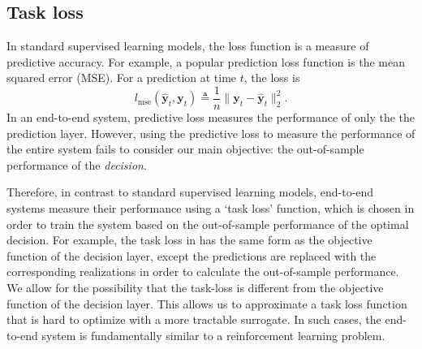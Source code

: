 \documentclass[10pt, twocolumn]{article}
\theoremstyle{plain}
\theoremstyle{definition}
\begin{document}
\subsection{Task loss}\label{sec:taskloss}

In standard supervised learning models, the loss function is a 
measure of predictive accuracy. For example, a popular prediction loss 
function is the mean squared error (MSE). For a prediction at time \(t\), the 
loss is  
\begin{equation}
\label{eq:loss_mse}
	l_{\text{mse}}(\hat{\bm{y}}_t, \bm{y}_t) \triangleq 
	\frac{1}{n}\|\bm{y}_t - \hat{\bm{y}}_t \|_2^2.
\end{equation}
In an end-to-end system, predictive loss measures the performance of only 
the the prediction layer. However, using the predictive loss to measure 
the performance of the entire system fails to consider our main objective: 
the out-of-sample performance of the \emph{decision}.

Therefore, in contrast to standard supervised learning models, end-to-end systems 
measure their performance using a `task loss' function, which is chosen in 
order to train the system based on the out-of-sample performance of the 
optimal decision. For example, the task loss in \citet{butler2021integrating} 
has the same form as the objective function of the decision layer, except 
the predictions are replaced with the corresponding realizations in order 
to calculate the out-of-sample performance. We allow for the possibility 
that the task-loss is different from the objective function of the decision 
layer. This allows us to approximate a task loss function that is hard to 
optimize with a more tractable surrogate. In such cases, the end-to-end 
system is fundamentally similar to a reinforcement learning problem.  
\end{document}
